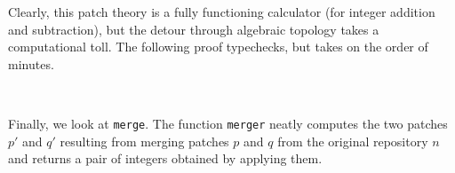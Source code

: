 Clearly, this patch theory is a fully functioning calculator (for integer addition and subtraction),
but the detour through algebraic topology takes a computational toll.
The following proof typechecks, but takes on the order of minutes.
\begin{code}%
%
\>[2]\AgdaFunction{\AgdaUnderscore{}}\AgdaSpace{}%
\AgdaSymbol{:}\AgdaSpace{}%
\AgdaSpace{}%
\AgdaSymbol{(}\AgdaSpace{}%
\AgdaSymbol{)}\AgdaSpace{}%
\AgdaSpace{}%
\AgdaSpace{}%
\<%
\\
%
\>[2]\AgdaSymbol{\AgdaUnderscore{}}\AgdaSpace{}%
\AgdaSymbol{=}\AgdaSpace{}%
\<%
\end{code}


Finally, we look at \texttt{merge}. The function \texttt{merger} neatly computes the two patches
$p'$ and $q'$ resulting from merging patches $p$ and $q$ from the original repository $n$
and returns a pair of integers obtained by applying them.

